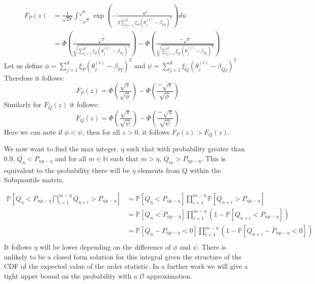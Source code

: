 \documentclass{article} %
\begin{document}
\begin{appendices}
	\begin{align}
		F_P(z) &= \frac{1}{\sqrt{2\pi}}\int_{-\sqrt{z}}^{\sqrt{z}}\exp\left(-\frac{u^2}{2\sum_{j=1}^d \xi_P\left(\theta_j^{(t)} - \beta_{Pj}\right)^2}\right)du &&\\
		&= \Phi\left(\frac{\sqrt{z}}{\sqrt{\sum_{j=1}^d \xi_P\left(\theta_j^{(t)}-\beta_{Pj}\right)^2}}\right) - \Phi\left(\frac{-\sqrt{z}}{\sqrt{\sum_{j=1}^d \xi_Q\left(\theta_j^{(t)}-\beta_{Pj}\right)^2}}\right) &&
	\end{align}
	Let us define $\displaystyle \phi = \sum_{j=1}^d \xi_P\left(\theta_j^{(t)} - \beta_{Pj}\right)^2$ and $\displaystyle \psi = \sum_{j=1}^d \xi_Q\left(\theta_j^{(t)} - \beta_{Qj}\right)^2$
	Therefore it follows:
	\begin{equation}
		F_P(z) = \Phi\left(\frac{\sqrt{z}}{\sqrt{\phi}}\right) - \Phi\left(\frac{-\sqrt{z}}{\sqrt{\phi}}\right)
	\end{equation}
	Similarly for $F_Q(z)$ it follows:
	\begin{equation}
		F_Q(z) = \Phi\left(\frac{\sqrt{z}}{\sqrt{\psi}}\right) - \Phi\left(\frac{-\sqrt{z}}{\sqrt{\psi}}\right)
	\end{equation}
	Here we can note if $\phi < \psi$, then for all $z > 0$, it follows $F_P(z) > F_Q(z)$.
	
	We now want to find the max integer, $\eta$ such that with probability greater than $0.9$, $Q_{\eta} < P_{np - \eta}$ and for all $m \in \mathbb{N}$ such that $m > \eta$, $Q_{m} > P_{np - \eta}$. This is equivalent to the probability there will be $\eta$ elements from $Q$ within the Subquantile matrix.

	\begin{align*}
		\mathbb{P}\left[Q_\eta < P_{np - \eta} \bigcap_{i=1}^{n\epsilon - \eta} Q_{\eta+ i} > P_{np - \eta}\right] &= \mathbb{P}\left[Q_\eta < P_{np - \eta}\right] \prod_{i=1}^{n\epsilon - \eta} \mathbb{P}\left[Q_{n+i} > P_{np - \eta}\right] &&\\
		&= \mathbb{P}\left[Q_n < P_{np - \eta}\right]\prod_{i=1}^{n\epsilon - \eta}\left(1 - \mathbb{P}\left[Q_{n+i} < P_{np - \eta}\right]\right) &&\\
		&= \mathbb{P}\left[Q_n - P_{np-\eta} < 0\right]\prod_{i=1}^{n\epsilon - \eta} \left(1 - \mathbb{P}\left[Q_{n+i} - P_{np-\eta} < 0\right]\right) &&\\
	\end{align*}
	It follows $\eta$ will be lower depending on the difference of $\phi$ and $\psi$. There is unlikely to be a closed form solution for this integral given the structure of the CDF of the expected value of the order statistic. In a further work we will give a tight upper bound on the probability with a $\mathcal{O}$ approximation.


\end{appendices}
\end{document}
